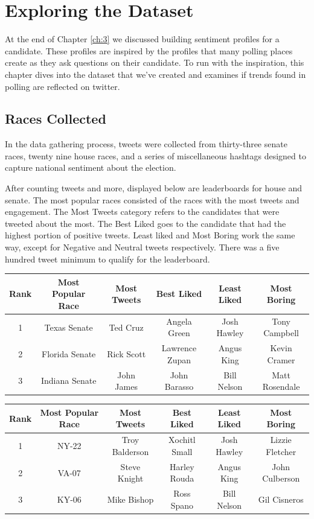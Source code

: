 \documentclass[11pt, twoside, reqno]{book}
\begin{document}
\chapter{Exploring the Dataset}
\label{ch:4}

\hspace{0.2in}At the end of Chapter \ref{ch:3} we discussed building sentiment profiles for a candidate. These profiles are inspired by the profiles that many polling places create as they ask questions on their candidate. To run with the inspiration, this chapter dives into the dataset that we've created and examines if trends found in polling are reflected on twitter.  

\section{Races Collected}
\hspace{0.2in}In the data gathering process, tweets were collected from thirty-three senate races, twenty nine house races, and a series of miscellaneous hashtags designed to capture national sentiment about the election. 

After counting tweets and more, displayed below are leaderboards for house and senate. The most popular races consisted of the races with the most tweets and engagement. The Most Tweets category refers to the candidates that were tweeted about the most. The Best Liked goes to the candidate that had the highest portion of positive tweets. Least liked and Most Boring work the same way, except for Negative and Neutral tweets respectively. There was a five hundred tweet minimum to qualify for the leaderboard. 
\begin{center}
\begin{tabular}{ |c|c|c|c|c|c|} 
	\hline
	Rank & Most Popular Race & Most Tweets & Best Liked & Least Liked & Most Boring \\
 	\hline 
	1 & Texas Senate & Ted Cruz & Angela Green & Josh Hawley & Tony Campbell\\
  	\hline
	2 & Florida Senate & Rick Scott & Lawrence Zupan & Angus King & Kevin Cramer\\ 
	\hline
	3 & Indiana Senate & John James & John Barasso & Bill Nelson& Matt Rosendale\\
	\hline
\end{tabular}
\end{center}
\begin{center}
\begin{tabular}{ |c|c|c|c|c|c|} 
	\hline
	Rank & Most Popular Race & Most Tweets & Best Liked & Least Liked & Most Boring \\
 	\hline 
	1 & NY-22 & Troy Balderson & Xochitl Small & Josh Hawley & Lizzie Fletcher\\
  	\hline
	2 & VA-07 & Steve Knight & Harley Rouda & Angus King & John Culberson\\ 
	\hline
	3 & KY-06 & Mike Bishop & Ross Spano & Bill Nelson& Gil Cisneros\\
	\hline
\end{tabular}
\end{center}
\end{document}
